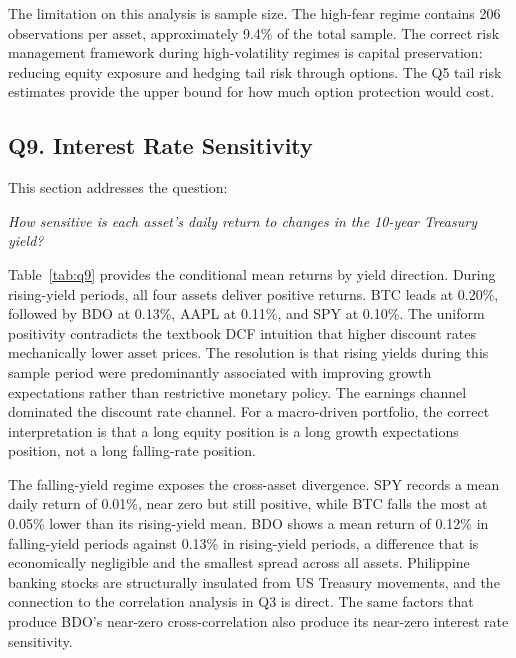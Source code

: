 The limitation on this analysis is sample size. The high-fear regime contains 206 observations per asset, approximately 9.4\% of the total sample. The correct risk management framework during high-volatility regimes is capital preservation: reducing equity exposure and hedging tail risk through options. The Q5 tail risk estimates provide the upper bound for how much option protection would cost.

\subsection{Q9. Interest Rate Sensitivity}

This section addresses the question:

\noindent\textit{How sensitive is each asset's daily return to changes in the 10-year Treasury yield?}



Table~\ref{tab:q9} provides the conditional mean returns by yield direction. During rising-yield periods, all four assets deliver positive returns. BTC leads at 0.20\%, followed by BDO at 0.13\%, AAPL at 0.11\%, and SPY at 0.10\%. The uniform positivity contradicts the textbook DCF intuition that higher discount rates mechanically lower asset prices. The resolution is that rising yields during this sample period were predominantly associated with improving growth expectations rather than restrictive monetary policy. The earnings channel dominated the discount rate channel. For a macro-driven portfolio, the correct interpretation is that a long equity position is a long growth expectations position, not a long falling-rate position.

The falling-yield regime exposes the cross-asset divergence. SPY records a mean daily return of 0.01\%, near zero but still positive, while BTC falls the most at 0.05\% lower than its rising-yield mean. BDO shows a mean return of 0.12\% in falling-yield periods against 0.13\% in rising-yield periods, a difference that is economically negligible and the smallest spread across all assets. Philippine banking stocks are structurally insulated from US Treasury movements, and the connection to the correlation analysis in Q3 is direct. The same factors that produce BDO's near-zero cross-correlation also produce its near-zero interest rate sensitivity.


